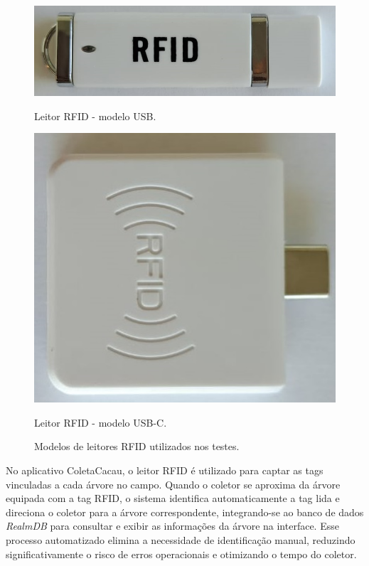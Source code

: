 \begin{figure}[H]
    \centering
    \begin{minipage}[b]{0.45\textwidth}
        \centering
        \includegraphics[width=\textwidth]{images/rfid/reader-01.jpg}
        \caption*{Leitor RFID - modelo USB.}
    \end{minipage}
    \hspace{5pt}
    \begin{minipage}[b]{0.35\textwidth}
        \centering
        \includegraphics[width=\textwidth]{images/rfid/reader-02.jpg}
        \caption*{Leitor RFID - modelo USB-C.}
    \end{minipage}
    \hspace{5pt}
    
    \caption{Modelos de leitores RFID utilizados nos testes.}
    \label{fig:RfidModels}
\end{figure}

No aplicativo ColetaCacau, o leitor RFID é utilizado para captar as tags vinculadas a cada árvore no campo. Quando o coletor se aproxima da árvore equipada com a tag RFID, o sistema identifica automaticamente a tag lida e direciona o coletor para a árvore correspondente, integrando-se ao banco de dados \textit{RealmDB} para consultar e exibir as informações da árvore na interface. Esse processo automatizado elimina a necessidade de identificação manual, reduzindo significativamente o risco de erros operacionais e otimizando o tempo do coletor.

